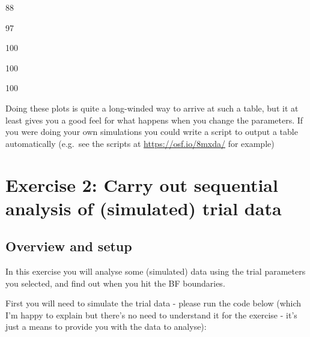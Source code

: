 \documentclass[
]{book}
\begin{document}
88

97

100

100

100

Doing these plots is quite a long-winded way to arrive at such a table, but it at least gives you a good feel for what happens when you change the parameters. If you were doing your own simulations you could write a script to output a table automatically (e.g.~see the scripts at \url{https://osf.io/8mxda/} for example)

\hypertarget{exercise-2-carry-out-sequential-analysis-of-simulated-trial-data}{%
\section{Exercise 2: Carry out sequential analysis of (simulated) trial data}\label{exercise-2-carry-out-sequential-analysis-of-simulated-trial-data}}

\hypertarget{overview-and-setup}{%
\subsection{Overview and setup}\label{overview-and-setup}}

In this exercise you will analyse some (simulated) data using the trial parameters you selected, and find out when you hit the BF boundaries.

First you will need to simulate the trial data - please run the code below (which I'm happy to explain but there's no need to understand it for the exercise - it's just a means to provide you with the data to analyse):
\end{document}
